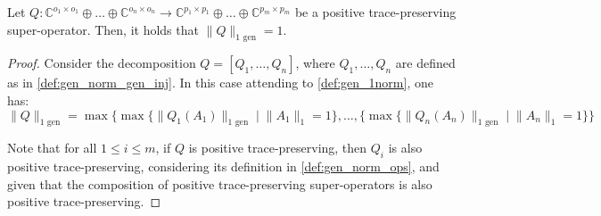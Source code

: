 \begin{proposition} \label{lem:gen_trace_ptp_norm1}
  Let  $Q: \mathbb{C}^{o_1 \times o_1} \oplus \ldots \oplus \mathbb{C}^{o_n \times o_n}  \rightarrow \mathbb{C}^{p_1 \times p_1} \oplus \ldots \oplus  \mathbb{C}^{p_m \times p_m}$ be a positive trace-preserving super-operator. Then, it holds that $\lVert Q \rVert_{1 \text{ gen}} = 1$.
\end{proposition}

\begin{proof}
  Consider the decomposition $Q = [Q_1, \ldots, Q_n]$, where $Q_1, \ldots, Q_n$ are defined as in \autoref{def:gen_norm_gen_inj}. %
  In this case attending to \autoref{def:gen_1norm}, one has:
  \begin{equation}
      \lVert Q \rVert_{1 \text{ gen}} = \max \{ \max \{ \lVert Q_1 (A_1) \rVert_{1  \text{ gen}} \mid \lVert A_1 \rVert_1 = 1\}, \ldots , \{ \max \{ \lVert Q_n (A_n) \rVert_{1  \text{ gen}} \mid \lVert A_n \rVert_1 = 1\} \}
  \end{equation}

Note that for all $1 \leq i \leq m$, if $Q$ is positive trace-preserving, then $Q_i$ is also positive trace-preserving, considering its definition in \autoref{def:gen_norm_ops},  and given that the composition of positive trace-preserving super-operators is also positive trace-preserving.


\end{proof}
